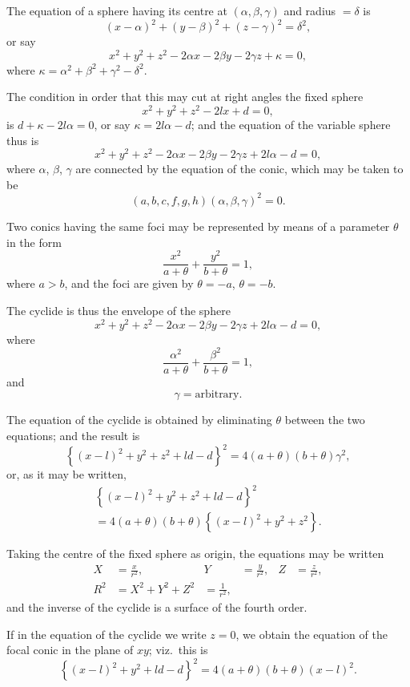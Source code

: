 \documentclass[11pt,a4paper]{article}
\theoremstyle{plain}
\theoremstyle{definition}
\theoremstyle{remark}
\begin{document}
The equation of a sphere having its centre at $(\alpha, \beta, \gamma)$ and radius $= \delta$ is
\[
(x - \alpha)^2 + (y - \beta)^2 + (z - \gamma)^2 = \delta^2,
\]
or say
\[
x^2 + y^2 + z^2 - 2\alpha x - 2\beta y - 2\gamma z + \kappa = 0,
\]
where $\kappa = \alpha^2 + \beta^2 + \gamma^2 - \delta^2$.

The condition in order that this may cut at right angles the fixed sphere
\[
x^2 + y^2 + z^2 - 2lx + d = 0,
\]
is $d + \kappa - 2l\alpha = 0$, or say $\kappa = 2l\alpha - d$; and the equation of the variable sphere thus is
\[
x^2 + y^2 + z^2 - 2\alpha x - 2\beta y - 2\gamma z + 2l\alpha - d = 0,
\]
where $\alpha$, $\beta$, $\gamma$ are connected by the equation of the conic, which may be taken to be
\[
(a, b, c, f, g, h)(\alpha, \beta, \gamma)^2 = 0.
\]

\newpage

Two conics having the same foci may be represented by means of a parameter $\theta$ in the form
\[
\frac{x^2}{a + \theta} + \frac{y^2}{b + \theta} = 1,
\]
where $a > b$, and the foci are given by $\theta = -a$, $\theta = -b$.

The cyclide is thus the envelope of the sphere
\[
x^2 + y^2 + z^2 - 2\alpha x - 2\beta y - 2\gamma z + 2l\alpha - d = 0,
\]
where
\[
\frac{\alpha^2}{a + \theta} + \frac{\beta^2}{b + \theta} = 1,
\]
and
\[
\gamma = \text{arbitrary}.
\]

The equation of the cyclide is obtained by eliminating $\theta$ between the two equations; and the result is
\[
\left\{ (x - l)^2 + y^2 + z^2 + ld - d \right\}^2 = 4(a + \theta)(b + \theta)\gamma^2,
\]
or, as it may be written,
\begin{multline*}
\left\{ (x - l)^2 + y^2 + z^2 + ld - d \right\}^2 \\
= 4(a + \theta)(b + \theta) \left\{ (x - l)^2 + y^2 + z^2 \right\}.
\end{multline*}

\newpage

Taking the centre of the fixed sphere as origin, the equations may be written
\begin{align*}
X &= \frac{x}{r^2}, & Y &= \frac{y}{r^2}, & Z &= \frac{z}{r^2}, \\
R^2 &= X^2 + Y^2 + Z^2 &= \frac{1}{r^2},
\end{align*}
and the inverse of the cyclide is a surface of the fourth order.

If in the equation of the cyclide we write $z = 0$, we obtain the equation of the focal conic in the plane of $xy$; viz.\ this is
\[
\left\{ (x - l)^2 + y^2 + ld - d \right\}^2 = 4(a + \theta)(b + \theta)(x - l)^2.
\]
\end{document}
